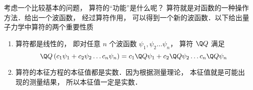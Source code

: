 
考虑一个比较基本的问题， 算符的“功能”是什么呢？ 算符就是对函数的一种操作方法．给出一个波函数， 经过算符作用， 可以得到一个新的波函数．以下给出量子力学中算符的两个重要性质
\begin{enumerate}
\item 算符都是线性的， 即对任意 $n$ 个波函数 ${\psi_1},{\psi_2}\dots{\psi_n}$，  算符 $\Q Q$ 满足
\begin{equation}
\Q Q\left( {{c_1} {\psi_1} + {c_2} {\psi_2}\dots{c_n}{\psi_n}} \right) = {c_1}\Q Q  {\psi_1} + {c_2}\Q Q  {\psi_2}\dots{c_n}\Q Q  {\psi_n}
\end{equation}
\item 算符的本征方程的本征值都是实数．因为根据测量理论， 本征值就是可能出现的测量结果， 所以本征值一定是实数．
\end{enumerate}

